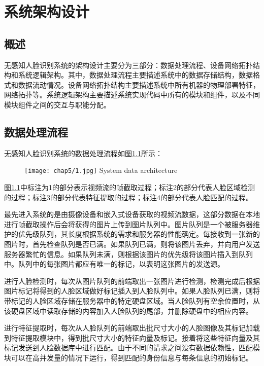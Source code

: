 \chapter{系统架构设计}

\section{概述}

无感知人脸识别系统的架构设计主要分为三部分：数据处理流程、设备网络拓扑结构和系统逻辑架构。其中，数据处理流程主要描述系统中的数据存储结构，数据格式和数据流动情况。设备网络拓扑结构主要描述系统中所有机器的物理部署特征，网络拓扑等。系统逻辑架构主要描述系统实现代码中所有的模块和组件，以及不同模块组件之间的交互与职能分配。

\section{数据处理流程}

无感知人脸识别系统的数据处理流程如图\ref{fig:chap5:data}所示：

\begin{figure}[!htp]
	\centering
	\texttt{[image: chap5/1.jpg]}
	{System data architecture}
	\label{fig:chap5:data}
\end{figure}

图\ref{fig:chap5:data}中标注为1的部分表示视频流的帧截取过程；标注2的部分代表人脸区域检测的过程；标注3的部分代表特征提取的过程；标注4的部分代表人脸匹配的过程。

最先进入系统的是由摄像设备和嵌入式设备获取的视频流数据，这部分数据在本地进行帧截取操作后会将获得的图片上传到图片队列中。图片队列是一个被服务器维护的优先级队列，其长度根据系统的需求和服务器的性能确定。每接收到一张新的图片时，首先检查队列是否已满。如果队列已满，则将该图片丢弃，并向用户发送服务器繁忙的信息。如果队列未满，则根据该图片的优先级将该图片插入到队列中。队列中的每张图片都应有唯一的标记，以表明这张图片的发送源。

进行人脸检测时，每次从图片队列的前端取出一张图片进行检测，检测完成后根据图片标记将得到的人脸区域做好标记插入到人脸队列中。如果人脸队列已满，则将带标记的人脸区域存储在服务器中的特定硬盘区域。当人脸队列有空余位置时，从该硬盘区域中读取存储的内容加入人脸队列的尾部，并删除硬盘中的相应内容。

进行特征提取时，每次从人脸队列的前端取出批尺寸大小的人脸图像及其标记加载到特征提取模块中，得到批尺寸大小的特征向量及标记。接着将这些特征向量及其标记发送到人脸数据库中进行匹配。由于不同的请求之间没有数据依赖性，匹配模块可以在高并发量的情况下运行，得到匹配的身份信息与每条信息的初始标记。

